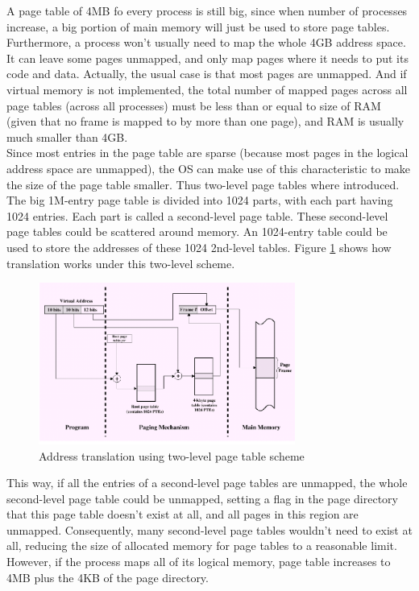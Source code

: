 \documentclass[oneside]{book}
\begin{document}
A page table of 4MB fo every process is still big, since when
number of processes increase, a big portion of main memory will
just be used to store page tables. Furthermore, a process
won't usually need to map the whole 4GB address space. It can leave
some pages unmapped, and only map pages where it needs to put
its code and data. Actually, the usual case is that most pages are
unmapped. And if virtual memory is not implemented, the total
number of mapped pages across all page tables (across all processes)
must be less than or equal to size of RAM (given that no frame
is mapped to by more than one page), and RAM is usually
much smaller than 4GB.\\

Since most entries in the page table are sparse (because most pages
in the logical address space are unmapped), the OS can make use
of this characteristic to make the size of the page table smaller.
Thus two-level page tables where introduced. The big 1M-entry page
table is divided into 1024 parts, with each part having 1024 entries.
Each part is called a second-level page table. These second-level
page tables could be scattered around memory. An 1024-entry table
could be used to store the addresses of these 1024 2nd-level tables.
Figure \ref{pagetable2} shows how translation works under this
two-level scheme.

\begin{figure}[H]
\begin{center}
\includegraphics[width=0.75\textwidth]{pagetable2.png}
\end{center}
\caption{Address translation using two-level page table scheme}
\label{pagetable2}
\end{figure}

This way, if all the entries of a second-level page tables are
unmapped, the whole second-level page table could be unmapped,
setting a flag in the page directory that this page table
doesn't exist at all, and all pages in this region are unmapped.
Consequently, many second-level page tables wouldn't need to
exist at all, reducing the size of allocated memory for page
tables to a reasonable limit. However, if the process maps
all of its logical memory, page table increases to 4MB plus
the 4KB of the page directory. \\
\end{document}
